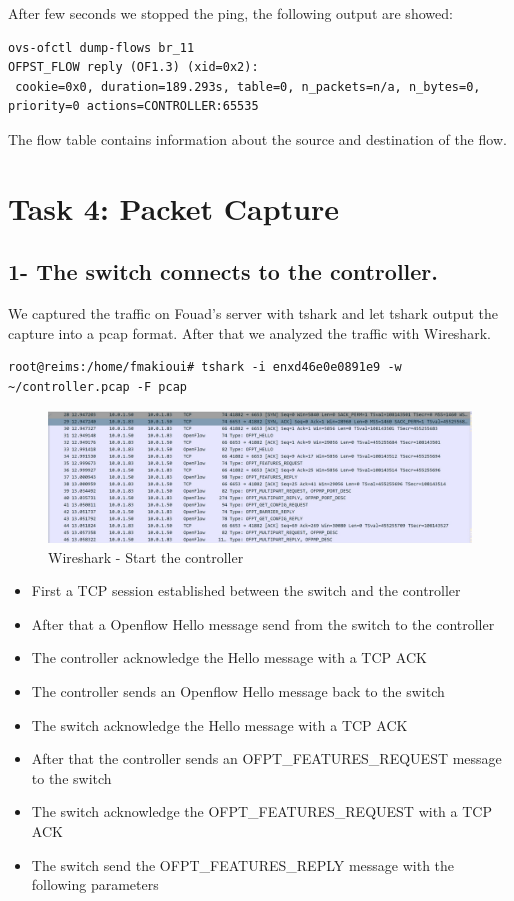 \documentclass[a4paper]{article}
\begin{document}
After few seconds we stopped the ping, the following output are showed:

\begin{verbatim}
ovs-ofctl dump-flows br_11 
OFPST_FLOW reply (OF1.3) (xid=0x2):
 cookie=0x0, duration=189.293s, table=0, n_packets=n/a, n_bytes=0, priority=0 actions=CONTROLLER:65535
\end{verbatim}

The flow table contains information about the source and destination of the flow. 

\newpage
\section{Task 4: Packet Capture}
\subsection{1- The switch connects to the controller.}
We captured the traffic on Fouad's server with tshark and let tshark output the capture into a pcap format. After that we analyzed the traffic with Wireshark.

\begin{verbatim}
root@reims:/home/fmakioui# tshark -i enxd46e0e0891e9 -w ~/controller.pcap -F pcap
\end{verbatim}
\label{sec:task4}
\begin{figure}[h]
    \centering
    \includegraphics[scale=0.2]{images/floodlight.jpg}
    \caption{Wireshark - Start the controller}
    \label{fig:tolopogy}
\end{figure}


\begin{itemize}[noitemsep]
\item First a TCP session established between the switch and the controller
\item After that a Openflow Hello message send from the switch to the controller
\item The controller acknowledge the Hello message with a TCP ACK
\item The controller sends an Openflow Hello message back to the switch
\item The switch acknowledge the Hello message with a TCP ACK
\item After that the controller sends an OFPT\_FEATURES\_REQUEST message to the switch
\item The switch acknowledge the OFPT\_FEATURES\_REQUEST with a TCP ACK
\item The switch send the OFPT\_FEATURES\_REPLY message with the following parameters 
\end{itemize}
\end{document}
